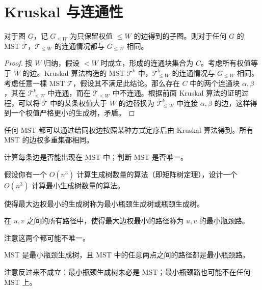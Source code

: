 \section{Kruskal 与连通性}

\begin{corollary}
    对于图 $G$，记 $G_{\le W}$ 为只保留权值 $\le W$ 的边得到的子图。则对于任何 $G$ 的 MST $\mathcal T$，$\mathcal T_{\le W}$ 的连通情况都与 $G_{\le W}$ 相同。
\end{corollary}
\begin{proof}
    按 $W$ 归纳，假设 $<W$ 时成立，形成的连通块集合为 $C$。考虑所有权值等于 $W$ 的边。Kruskal 算法构造的 MST $\mathcal T^k$ 中，$\mathcal T^k_{\le W}$ 的连通情况与 $G_{\le W}$ 相同。考虑任意一棵 MST $\mathcal T$，假设其不满足此结论。那么存在 $C$ 中的两个连通块 $\alpha,\beta$，其在 $\mathcal T^k_{\le W}$ 中连通，而在 $\mathcal T_{\le W}$ 中不连通。根据前面 Kruskal 算法的证明过程，可以将 $\mathcal T$ 中的某条权值大于 $W$ 的边替换为 $\mathcal T^k_{\le W}$ 中连接 $\alpha,\beta$ 的边，这样得到一个权值严格更小的生成树，矛盾。
\end{proof}
\begin{corollary}
    任何 MST 都可以通过给同权边按照某种方式定序后由 Kruskal 算法得到。所有 MST 的边权多重集都相同。
\end{corollary}

\begin{exercise}
    计算每条边是否能出现在 MST 中；判断 MST 是否唯一。
\end{exercise}
\begin{exercise}[{P4208 [JSOI2008] 最小生成树计数}]
    假设你有一个 $O(n^3)$ 计算生成树数量的算法（即矩阵树定理），设计一个 $O(n^3)$ 计算最小生成树数量的算法。
\end{exercise}


\begin{definition}[最小瓶颈路与最小瓶颈生成树]
    使得最大边权最小的生成树称为最小瓶颈生成树或瓶颈生成树。

    在 $u,v$ 之间的所有路径中，使得最大边权最小的路径称为 $u,v$ 的最小瓶颈路。
\end{definition}
\begin{remark}
    注意这两个都可能不唯一。
\end{remark}
\begin{theorem}
    MST 是最小瓶颈生成树，且 MST 中的任意两点之间的路径都是最小瓶颈路。
\end{theorem}
\begin{remark}
    注意反过来不成立：最小瓶颈生成树未必是 MST；最小瓶颈路也可能不在任何 MST 上。
\end{remark}



